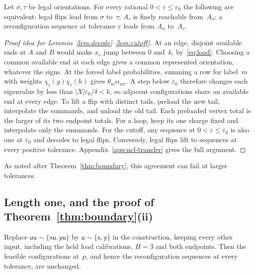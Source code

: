 \begin{lemma}\label{lem:cutoff}
Let $\sigma,\tau$ be legal orientations. For every rational $0<\varepsilon\le\varepsilon_0$ the
following are equivalent: legal flips lead from $\sigma$ to~$\tau$;
$A_\tau$ is finely reachable from~$A_\sigma$; a reconfiguration sequence at
tolerance $\varepsilon$ leads from $A_\sigma$ to~$A_\tau$.
\end{lemma}

\begin{proof}[Proof idea for Lemmas~\ref{lem:decode}--\ref{lem:cutoff}]
At an edge, disjoint available ends at $A$ and $B$ would make $x_e$ jump
between $0$ and~$k$, by~\eqref{eq:load}. Choosing a common available end at
each edge gives a common represented orientation, whatever the signs.
At the forced label probabilities, summing a row for label~$m$ with
weights $\chi_i(g)\chi_i(h)$ gives $\theta_m\alpha_{mi}$. A step below
$\varepsilon_0$ therefore changes each eigenvalue by less than
$|X|\varepsilon_0/\delta<k$, so adjacent configurations share an available
end at every edge. To lift a flip with distinct tails, preload the new tail, interpolate
the summands, and unload the old tail. Each preloaded vertex total is the
larger of its two endpoint totals. For a loop, keep its one charge fixed
and interpolate only the summands. For the cutoff, any sequence at $0<\varepsilon\le\varepsilon_0$ is also one at
$\varepsilon_0$ and decodes to legal flips. Conversely, legal flips lift to
sequences at every positive tolerance.
Appendix~\ref{app:ncl-transfer} gives the full argument.
\end{proof}

As noted after Theorem~\ref{thm:boundary}, this agreement can fail at
larger tolerances.

\subsection{Length one, and the proof of Theorem~\ref{thm:boundary}(ii)}\label{sec:length-one}

\begin{proposition}\label{prop:length-one}
Replace $\mathsf{uu}\sim\{\mathsf{xu},\mathsf{yu}\}$ by
$\mathsf u\sim\{\mathsf x,\mathsf y\}$ in the construction, keeping every
other input, including the held load calibrations, $H=3$ and both
endpoints. Then the feasible
configurations at~$p$, and hence the reconfiguration sequences at every
tolerance, are unchanged.
\end{proposition}

